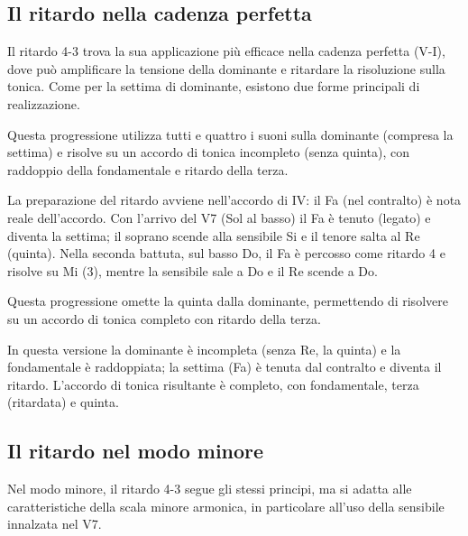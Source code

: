 \subsection{Il ritardo nella cadenza perfetta}
\label{subsec:ritardo_cadenza}

Il ritardo 4-3 trova la sua applicazione più efficace nella cadenza perfetta (V-I), dove può amplificare la tensione della dominante e ritardare la risoluzione sulla tonica. Come per la settima di dominante, esistono due forme principali di realizzazione.

\begin{esempio}
	\label{ex:ritardo_completo_maggiore}
	Questa progressione utilizza tutti e quattro i suoni sulla dominante (compresa la settima) e risolve su un accordo di tonica incompleto (senza quinta), con raddoppio della fondamentale e ritardo della terza.
	
	
	La preparazione del ritardo avviene nell'accordo di IV: il Fa (nel contralto) è nota reale dell'accordo. Con l'arrivo del V7 (Sol al basso) il Fa è tenuto (legato) e diventa la settima; il soprano scende alla sensibile Si e il tenore salta al Re (quinta). Nella seconda battuta, sul basso Do, il Fa è percosso come ritardo 4 e risolve su Mi (3), mentre la sensibile sale a Do e il Re scende a Do.
\end{esempio}

\begin{esempio}
	\label{ex:ritardo_incompleto_maggiore}
	Questa progressione omette la quinta dalla dominante, permettendo di risolvere su un accordo di tonica completo con ritardo della terza.
	
	
	In questa versione la dominante è incompleta (senza Re, la quinta) e la fondamentale è raddoppiata; la settima (Fa) è tenuta dal contralto e diventa il ritardo. L'accordo di tonica risultante è completo, con fondamentale, terza (ritardata) e quinta.
\end{esempio}

\subsection{Il ritardo nel modo minore}
\label{subsec:ritardo_minore}

Nel modo minore, il ritardo 4-3 segue gli stessi principi, ma si adatta alle caratteristiche della scala minore armonica, in particolare all'uso della sensibile innalzata nel V7.


